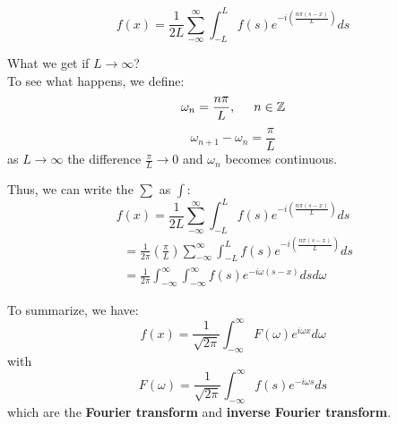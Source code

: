 \documentclass[12pt]{article} %
\begin{document}
$$f(x) = \frac{1}{2L} \sum_{-\infty}^{\infty} \int_{-L}^{L} f(s)e^{-i(\frac{n\pi (s-x)}{L})}ds$$\par
What we get if  $L \to \infty$?\\ 
To see what happens, we define:
$$
\omega_{n} = \frac{n\pi}{L}, \hspace{5mm} n \in \mathbb{Z}
$$
$$
\omega_{n+1}-\omega_{n}=\frac{\pi}{L}
$$as $L \to \infty$ the difference $\frac{\pi}{L} \to 0$ and $\omega_{n}$ becomes continuous.\par
Thus, we can write the $\sum$ as $\int$:
\begin{equation}
f(x) = \frac{1}{2L} \sum_{-\infty}^{\infty} \int_{-L}^{L} f(s)e^{-i(\frac{n\pi (s-x)}{L})}ds
\end{equation}
\begin{align*}
&= \frac{1}{2\pi} \left( \frac{\pi}{L} \right) \sum_{-\infty}^{\infty} \int_{-L}^{L} f(s)e^{-i(\frac{n\pi (s-x)}{L})}ds\\
&=  \frac{1}{2\pi} \int_{-\infty}^{\infty}\int_{-\infty}^{\infty} f(s)e^{-i\omega (s-x)}dsd\omega
\end{align*}\par
To summarize, we have:
\begin{equation}
f(x) = \frac{1}{\sqrt{2\pi}}\int_{-\infty}^{\infty} F(\omega) e^{i\omega x} d\omega
\end{equation}with
\begin{equation}
F(\omega) = \frac{1}{\sqrt{2\pi}}\int_{-\infty}^{\infty} f(s) e^{-i\omega s}ds
\end{equation} which are the \textbf{Fourier transform} and \textbf{inverse Fourier transform}. 
\end{document}
